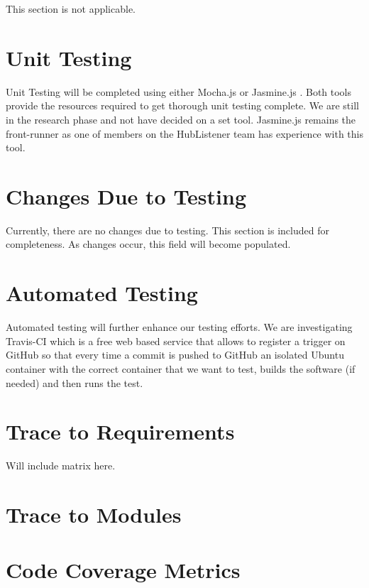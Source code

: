 \documentclass[12pt, titlepage]{article}
\begin{document}
This section is not applicable. 

\section{Unit Testing}

Unit Testing will  be completed using either Mocha.js or Jasmine.js . Both tools provide the resources required to get thorough unit testing complete. We are still in the research phase and not have decided on a set tool. Jasmine.js remains the front-runner as one of members on the HubListener team has experience with this tool. 

\section{Changes Due to Testing}

Currently, there are no changes due to testing. This section is included for completeness. As changes occur, this field will become populated. 

\section{Automated Testing}

Automated testing will further enhance our testing efforts. We are investigating Travis-CI which  is a free web based service that allows  to register a trigger on GitHub so that every time a commit is pushed to GitHub an isolated Ubuntu container with the correct container that we want to test, builds the software (if needed) and then runs the test.

		
\section{Trace to Requirements}

Will include matrix here. 
		
\section{Trace to Modules}		

\section{Code Coverage Metrics}




\end{document}
